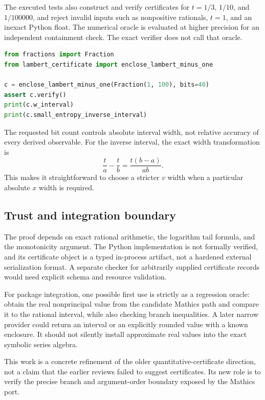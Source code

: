 \documentclass[11pt,a4paper]{article}
\begin{document}
The executed tests also construct and verify certificates for $t=1/3$, $1/10$, and $1/100000$, and reject invalid inputs such as nonpositive rationals, $t=1$, and an inexact Python float. The numerical oracle is evaluated at higher precision for an independent containment check. The exact verifier does not call that oracle.

\begin{lstlisting}[language=Python]
from fractions import Fraction
from lambert_certificate import enclose_lambert_minus_one

c = enclose_lambert_minus_one(Fraction(1, 100), bits=40)
assert c.verify()
print(c.w_interval)
print(c.small_entropy_inverse_interval)
\end{lstlisting}
The requested bit count controls absolute interval width, not relative accuracy of every derived observable. For the inverse interval, the exact width transformation is
\begin{equation}
 \frac{t}{a}-\frac{t}{b}=\frac{t(b-a)}{ab}.
\end{equation}
This makes it straightforward to choose a stricter $v$ width when a particular absolute $x$ width is required.

\subsection{Trust and integration boundary}
The proof depends on exact rational arithmetic, the logarithm tail formula, and the monotonicity argument. The Python implementation is not formally verified, and its certificate object is a typed in-process artifact, not a hardened external serialization format. A separate checker for arbitrarily supplied certificate records would need explicit schema and resource validation.

For package integration, one possible first use is strictly as a regression oracle: obtain the real nonprincipal value from the candidate Mathics path and compare it to the rational interval, while also checking branch inequalities. A later narrow provider could return an interval or an explicitly rounded value with a known enclosure. It should not silently install approximate real values into the exact symbolic series algebra.

This work is a concrete refinement of the older quantitative-certificate direction, not a claim that the earlier reviews failed to suggest certificates. Its new role is to verify the precise branch and argument-order boundary exposed by the Mathics port.
\end{document}
